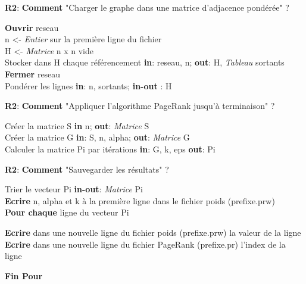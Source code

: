 \documentclass{NewTeXRaffinage}
\begin{document}
\textbf{R2}: \textbf{Comment} "Charger le graphe dans une matrice d'adjacence pondérée" ?
\begin{addmargin}[5em]{0pt}
    \textbf{Ouvrir} reseau \\
    n <- \textit{Entier} sur la première ligne du fichier \\
    H <- \textit{Matrice} n x n vide \\
    Stocker dans H chaque référencement 
    \hspace*{0pt}\hfill \textbf{in}: reseau, n; \textbf{out}: H, \textit{Tableau} sortants \\
    \textbf{Fermer} reseau\\
    Pondérer les lignes 
    \hspace*{0pt}\hfill \textbf{in}: n, sortants; \textbf{in-out} : H 
\end{addmargin}

\textbf{R2}: \textbf{Comment} "Appliquer l'algorithme PageRank jusqu'à terminaison" ?
\begin{addmargin}[5em]{0pt}
    Créer la matrice S 
    \hspace*{0pt}\hfill \textbf{in} n; \textbf{out}: \textit{Matrice} S \\
    Créer la matrice G 
    \hspace*{0pt}\hfill \textbf{in}: S, n, alpha; \textbf{out}: \textit{Matrice} G \\
    Calculer la matrice Pi par itérations
    \hspace*{0pt}\hfill \textbf{in}: G, k, eps \textbf{out}: Pi \\
\end{addmargin}

\textbf{R2}: \textbf{Comment} "Sauvegarder les résultats" ?
\begin{addmargin}[5em]{0pt}
    Trier le vecteur Pi \hspace*{0pt}\hfill \textbf{in-out}: \textit{Matrice} Pi\\
    \textbf{Ecrire} n, alpha et k à la première ligne dans le fichier poids (prefixe.prw) \\
    \textbf{Pour chaque} ligne du vecteur Pi
     \begin{addmargin}[3em]{0pt}
        \textbf{Ecrire} dans une nouvelle ligne du fichier poids (prefixe.prw) la valeur de la ligne \\
        \textbf{Ecrire} dans une nouvelle ligne du fichier PageRank (prefixe.pr) l'index de la ligne 
     \end{addmargin}
     \textbf{Fin Pour} 
\end{addmargin}
\end{document}
